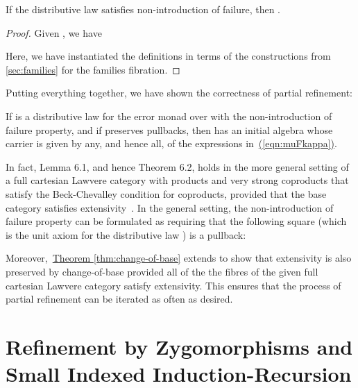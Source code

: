 \documentclass{LMCS}
\newcommand{\parenref}[1]{\hyperref[#1]{(\ref*{#1})}}
\newcommand{\thmref}[1]{\hyperref[#1]{Theorem \ref*{#1}}}
\begin{document}
\begin{lem}\label{lem:commute-ok}
  If the distributive law  satisfies non-introduction of
  failure, then .
\end{lem}

\begin{proof}
  Given , we have    
  
  Here, we have instantiated the definitions in terms of the
  constructions from \autoref{sec:families} for the families
  fibration.
\end{proof}

\noindent
Putting everything together, we have shown the correctness of partial
refinement:

\begin{thm}\label{thm:partial-refinement}
  If  is a distributive law for the error monad  over 
  with the non-introduction of failure property, and if  preserves
  pullbacks, then  has an initial algebra whose carrier
  is given by any, and hence all, of the expressions
  in~\parenref{eqn:muFkappa}.
\end{thm}

\noindent
In fact, Lemma 6.1, and hence Theorem 6.2, holds in the more general
setting of a full cartesian Lawvere category with products and very
strong coproducts that satisfy the Beck-Chevalley condition for
coproducts, provided that the base category satisfies
extensivity~\cite{clw93}. In the general setting, the non-introduction
of failure property can be formulated as requiring that the following
square (which is the unit axiom for the distributive law ) is
a pullback:

Moreover,~\thmref{thm:change-of-base} extends to show that extensivity
is also preserved by change-of-base provided all of the the fibres of
the given full cartesian Lawvere category satisfy extensivity. This
ensures that the process of partial refinement can be iterated as
often as desired.

\section{Refinement by Zygomorphisms and Small Indexed
Induction-Recursion}\label{sec:zygo-refine}
\end{document}
